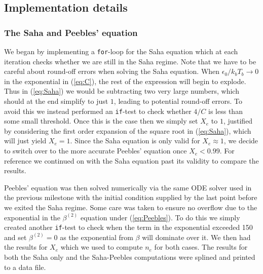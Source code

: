\documentclass[%
reprint,
 amsmath,amssymb,
 aps,
]{revtex4-2}
\begin{document}
\subsection{Implementation details}
\subsubsection{The Saha and Peebles' equation}
We began by implementing a \texttt{for}-loop for the Saha equation which at each iteration checks whether we are still in the Saha regime. Note that we have to be careful about round-off errors when solving the Saha equation. When $\epsilon_0/k_bT_b\to0$ in the exponential in (\ref{eq:C}), the rest of the expression will begin to explode. Thus in (\ref{eq:Saha}) we would be subtracting two very large numbers, which should at the end simplify to just $1$, leading to potential round-off errors. To avoid this we instead performed an \texttt{if}-test to check whether $4/C$ is less than some small threshold. Once this is the case then we simply set $X_e$ to $1$, justified by considering the first order expansion of the square root in (\ref{eq:Saha}), which will just yield $X_e=1$. Since the Saha equation is only valid for $X_e\approx1$, we decide to switch over to the more accurate Peebles' equation once $X_e<0.99$. For reference we continued on with the Saha equation past its validity to compare the results. 

Peebles' equation was then solved numerically via the same ODE solver used in the previous milestone with the initial condition supplied by the last point before we exited the Saha regime. Some care was taken to ensure no overflow due to the exponential in the $\beta^{(2)}$ equation under (\ref{eq:Peebles}). To do this we simply created another \texttt{if}-test to check when the term in the exponential exceeded 150 and set $\beta^{(2)}=0$ as the exponential from $\beta$ will dominate over it. We then had the results for $X_e$ which we used to compute $n_e$ for both cases. The results for both the Saha only and the Saha-Peebles computations were splined and printed to a data file.
\end{document}

